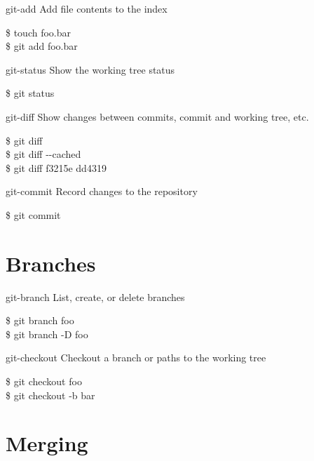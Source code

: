 \documentclass{beamer}
\begin{document}
\begin{frame}{git-add}
  Add file contents to the index
  \begin{Example}
    \$ touch foo.bar \\
    \$ git add foo.bar
  \end{Example}
\end{frame}

\begin{frame}{git-status}
  Show the working tree status
  \begin{Example}
    \$ git status
  \end{Example}
\end{frame}

\begin{frame}{git-diff}
  Show changes between commits, commit and working tree, etc.
  \begin{Example}
    \$ git diff \\
    \$ git diff -{}-cached \\
    \$ git diff f3215e dd4319
  \end{Example}
\end{frame}

\begin{frame}{git-commit}
  Record changes to the repository
  \begin{Example}
    \$ git commit
  \end{Example}
\end{frame}

\section{Branches}

\begin{frame}{git-branch}
  List, create, or delete branches
  \begin{Example}
    \$ git branch foo \\
    \$ git branch -D foo
  \end{Example}
\end{frame}

\begin{frame}{git-checkout}
  Checkout a branch or paths to the working tree
  \begin{Example}
    \$ git checkout foo \\
    \$ git checkout -b bar
  \end{Example}
\end{frame}

\section{Merging}
\end{document}
